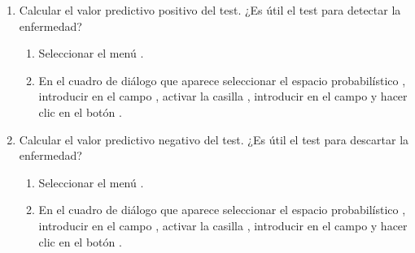 \begin{enumerate}[leftmargin=*]
\begin{enumerate}
\item Calcular el valor predictivo positivo del test. 
¿Es útil el test para detectar la enfermedad? 
\begin{indicacion}{
\begin{enumerate}
\item Seleccionar el menú .
\item En el cuadro de diálogo que aparece seleccionar el espacio probabilístico , introducir
 en el campo , activar la casilla , introducir
 en el campo  y hacer clic en el botón .
\end{enumerate}
}
\end{indicacion} 

\item Calcular el valor predictivo negativo del test.
¿Es útil el test para descartar la enfermedad?
\begin{indicacion}{
\begin{enumerate}
\item Seleccionar el menú .
\item En el cuadro de diálogo que aparece seleccionar el espacio probabilístico , introducir
 en el campo , activar la casilla , introducir
 en el campo  y hacer clic en el botón .
\end{enumerate}
}
\end{indicacion} 
\end{enumerate} 

\end{enumerate}


